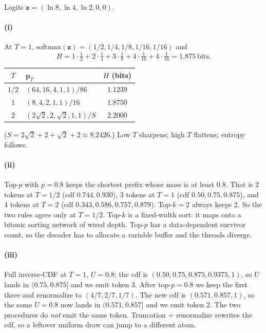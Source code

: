 \documentclass[11pt]{article}
\newcommand{\vct}[1]{\mathbf{#1}}
\begin{document}
Logits \(\vct{z}=(\ln 8,\ln 4,\ln 2,0,0)\).

\paragraph{(i)}
At \(T=1\), \(\mathrm{softmax}(\vct{z})=(1/2,1/4,1/8,1/16,1/16)\) and
\[
H=1\cdot\tfrac12+2\cdot\tfrac14+3\cdot\tfrac18+4\cdot\tfrac{1}{16}+4\cdot\tfrac{1}{16}=1.875\ \text{bits}.
\]
\begin{center}
\begin{tabular}{c l c}
\toprule
\(T\) & \(\vct{p}_T\) & \(H\) (bits) \\
\midrule
\(1/2\) & \((64,16,4,1,1)/86\) & \(1.1239\) \\
\(1\)   & \((8,4,2,1,1)/16\)   & \(1.8750\) \\
\(2\)   & \((2\sqrt{2},2,\sqrt{2},1,1)/S\) & \(2.2000\) \\
\bottomrule
\end{tabular}
\end{center}
(\(S=2\sqrt{2}+2+\sqrt{2}+2\approx 8.2426\).)
Low \(T\) sharpens; high \(T\) flattens; entropy follows.

\paragraph{(ii)}
Top-\(p\) with \(p=0.8\) keeps the shortest prefix whose mass is at
least 0.8. That is 2 tokens at \(T=1/2\) (cdf \(0.744,0.930\)),
3 tokens at \(T=1\) (cdf \(0.50,0.75,0.875\)), and 4 tokens at
\(T=2\) (cdf \(0.343,0.586,0.757,0.879\)).
Top-\(k=2\) always keeps 2. So the two rules agree only at \(T=1/2\).
Top-\(k\) is a fixed-width sort: it maps onto a bitonic sorting
network of wired depth. Top-\(p\) has a data-dependent survivor
count, so the decoder has to allocate a variable buffer and the
threads diverge.

\paragraph{(iii)}
Full inverse-CDF at \(T=1\), \(U=0.8\): the cdf is
\((0.50,0.75,0.875,0.9375,1)\), so \(U\) lands in
\((0.75,0.875]\) and we emit token 3.
After top-\(p=0.8\) we keep the first three and renormalize to
\((4/7,2/7,1/7)\). The new cdf is \((0.571,0.857,1)\), so the same
\(U=0.8\) now lands in \((0.571,0.857]\) and we emit token 2.
The two procedures do \emph{not} emit the same token.
Truncation + renormalize rewrites the cdf, so a leftover uniform
draw can jump to a different atom.
\end{document}
